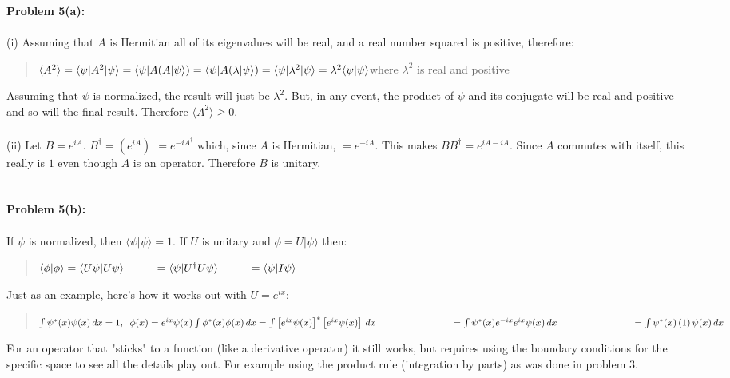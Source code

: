 \documentclass{article}
\begin{document}
\pagebreak
{\bf Problem 5(a):}
\\\\
(i) Assuming that $A$ is Hermitian all of its eigenvalues will be real, and
a real number squared is positive, therefore:
\begin{quote}
$
    \langle A^2 \rangle = \langle \psi| A^2 |\psi\rangle
    = \langle \psi| A (A|\psi\rangle)
    = \langle \psi| A (\lambda|\psi\rangle)
    = \langle \psi| \lambda^2|\psi\rangle
    = \lambda^2 \langle \psi| \psi\rangle
    \vspace{6pt}\\
    $where $\lambda^2$ is real and positive
\end{quote}
Assuming that $\psi$ is normalized, the result will just be $\lambda^2$.
But, in any event, the product of $\psi$ and its conjugate will be real
and positive and so will the final result. Therefore $\langle A^2 \rangle
\ge 0$.
\\\\
(ii) Let $B=e^{iA}$. $B^\dagger=\left(e^{iA}\right)^\dagger = e^{-iA^\dagger}$ 
    which, since $A$ is Hermitian, $=e^{-iA}$. This makes $BB^\dagger
    = e^{iA-iA}$. Since $A$ commutes with itself, this really is $1$ even
    though $A$ is an operator. Therefore $B$ is unitary.
\\\\\\
{\bf Problem 5(b):}
\\\\
If $\psi$ is normalized, then $\langle \psi|\psi\rangle = 1$. If
$U$ is unitary and $\phi=U|\psi\rangle$ then:
\begin{quote}
$
    \langle \phi|\phi\rangle
    = \langle U\psi|U\psi\rangle
    \vspace{6pt}\\ \hspace*{27pt}
    = \langle \psi|U^\dagger U\psi\rangle
    \vspace{6pt}\\ \hspace*{27pt}
    = \langle \psi|I\psi\rangle
$
\end{quote}
Just as an example, here's how it works out with $U=e^{ix}$:
\begin{quote}
$
    \int \psi^*(x) \psi(x)\,dx = 1,\;\; \phi(x) = e^{ix}\psi(x)
    \vspace{6pt}\\
    \int \phi^*(x) \phi(x)\,dx
    = \int \left[e^{ix}\psi(x)\right]^* \left[e^{ix}\psi(x)\right]\,dx
    \vspace{6pt}\\ \hspace*{78pt}
    = \int \psi^*(x)e^{-ix}e^{ix}\psi(x)\,dx
    \vspace{6pt}\\ \hspace*{78pt}
    = \int \psi^*(x)\,(1)\,\psi(x)\,dx
$
\end{quote}
For an operator that "sticks" to a function (like a derivative operator)
it still works, but requires using the boundary conditions for the specific
space to see all the details play out. For example using the product rule
(integration by parts) as was done in problem 3.
\end{document}
